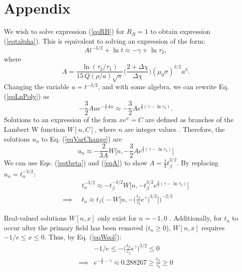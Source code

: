 \section{Appendix}

We wish to solve expression (\ref{eqRB}) for $R_B=1$ to obtain expression (\ref{eqtalpha}).  This is equivalent to solving an expression of the form:
\begin{equation}
\label{eqLnPoly} A t^{-3/2} + \ln t \approx -\gamma + \ln \tau_2,
\end{equation}
where
\begin{equation}
\label{eqA} A = \frac{\ln(\tau_2/\tau_1)}{15 \, Q(\rho /a)
\sqrt{\pi}} \! \Bigg ( \frac{2+\Delta \chi}{\Delta \chi} \Bigg )
(\mu_0 \sigma)^{3/2} a^3.
\end{equation}
Changing the variable $u=t^{-3/2}$, and with some algebra, we can rewrite Eq. (\ref{eqLnPoly}) as
\begin{equation}
\label{eqVarChange} - \frac{3}{2} A u e^{- \frac{3}{2} A u} \approx
- \frac{3}{2} A e^{\frac{3}{2} (\gamma - \ln \tau_2)}.
\end{equation}
Solutions to an expression of the form $x e^x = C$ are defined as branches of the  Lambert W function $W[n,C]$, where $n$ are integer
values \citep{Corless1996}. Therefore, the solutions $u_n$ to Eq. (\ref{eqVarChange}) are
\begin{equation}
u_n \approx - \frac{2}{3A} W \Big [ n, - \frac{3}{2} A e^{\frac{3}{2}(\gamma - \ln \tau_2)} \Big ]
\end{equation}
We can use Eqs. (\ref{eqtbeta}) and (\ref{eqA}) to show $A = \frac{2}{3} t_\beta^{3/2}$. By replacing $u_n =
t_n^{-3/2}$:
\begin{align}
&t_n^{-3/2} \approx - t_\beta^{-3/2} W \Big [ n, - t_\beta^{3/2} e^{\frac{3}{2}(\gamma - \ln \tau_2)} \Big ] \nonumber \\
\label{eqWsol}
\implies \; \; &t_n \approx t_\beta \Bigg ( - W \Bigg [ n, - \Big ( \frac{t_\beta}{\tau_2} e^\gamma \Big )^{3/2} \Bigg ] \Bigg )^{-2/3}
\end{align}

Real-valued solutions $W[n,x]$ only exist for $n=-1,0$ \cite{Corless1996}.  Additionally, for $t_n$ to occur after the primary field has been removed ($t_n \geq 0$), $W [n,x]$ requires $-1/e \leq x \leq 0$. Thus, by Eq. (\ref{eqWsol}):
\begin{align}
& -1/e \leq - \Big ( \frac{t_\beta}{\tau_2}e^\gamma \Big )^{3/2} \leq 0 \nonumber \\
\label{eqWcond}
\implies & e^{-\frac{2}{3}-\gamma} \approx 0.288267 \geq \frac{t_\beta}{\tau_2} \geq 0
\end{align}

